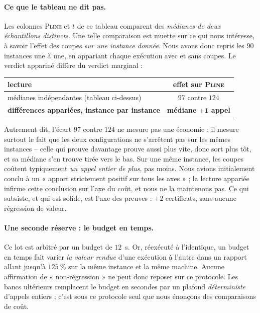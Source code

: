 \documentclass[11pt,a4paper]{article}
\theoremstyle{plain}
\theoremstyle{remark}
\newcommand{\ILP}{\textsc{Pline}}
\begin{document}
\paragraph{Ce que le tableau ne dit pas.} Les colonnes \ILP{} et $t$ de ce
tableau comparent des \emph{médianes de deux échantillons distincts}. Une
telle comparaison est muette sur ce qui nous intéresse, à savoir l'effet des
coupes \emph{sur une instance donnée}. Nous avons donc repris les $90$
instances une à une, en appariant chaque exécution avec et sans coupes. Le
verdict appariné diffère du verdict marginal :
%
\begin{center}
\begin{tabular}{lc}
\toprule
lecture & effet sur \ILP\\
\midrule
médianes indépendantes (tableau ci-dessus) & $97$ contre $124$\\
\textbf{différences appariées, instance par instance} & \textbf{médiane
 $\mathbf{+1}$ appel}\\
\bottomrule
\end{tabular}
\end{center}
%
\noindent
Autrement dit, l'écart $97$ contre $124$ ne mesure pas une économie : il
mesure surtout le fait que les deux configurations ne s'arrêtent pas sur les
mêmes instances -- celle qui prouve davantage prouve aussi plus vite, donc
sort plus tôt, et sa médiane s'en trouve tirée vers le bas. Sur une même
instance, les coupes coûtent typiquement \emph{un appel entier de plus},
pas moins. Nous avions initialement conclu à un « apport strictement positif
sur tous les axes » ; la lecture appariée infirme cette conclusion sur l'axe
du coût, et nous ne la maintenons pas. Ce qui subsiste, et qui est solide,
est l'axe des preuves : $+2$ certificats, sans aucune régression de valeur.

\paragraph{Une seconde réserve : le budget en temps.} Ce lot est arbitré
par un budget de $12$~s. Or, réexécuté à l'identique, un budget en temps
fait varier \emph{la valeur rendue} d'une exécution à l'autre dans un
rapport allant jusqu'à $125\ \%$ sur la même instance et la même machine.
Aucune affirmation de « non-régression » ne peut donc reposer sur ce
protocole. Les bancs ultérieurs remplacent le budget en secondes par un
plafond \emph{déterministe} d'appels entiers ; c'est sous ce protocole seul
que nous énonçons des comparaisons de coût.
\end{document}
